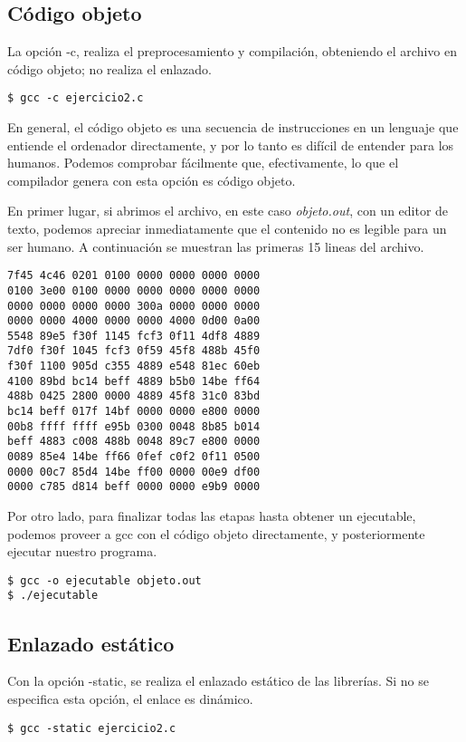 \documentclass[10pt,a4paper]{article}
\begin{document}
\subsection{Código objeto}
La opción -c, realiza el preprocesamiento y compilación, obteniendo el archivo en código objeto; no realiza el enlazado. 
\begin{lstlisting}[style=consola, numbers=none]
$ gcc -c ejercicio2.c
\end{lstlisting}
En general, el código objeto es una secuencia de instrucciones  en un lenguaje que entiende el ordenador directamente, y por lo tanto es difícil de entender para los humanos. Podemos comprobar fácilmente que, efectivamente, lo que el compilador genera con esta opción es código objeto.

En primer lugar, si abrimos el archivo, en este caso \textit{objeto.out}, con un editor de texto, podemos apreciar inmediatamente que el contenido no es legible para un ser humano. A continuación se muestran las primeras 15 lineas del archivo.

\begin{lstlisting}[style=consola, numbers=none]
7f45 4c46 0201 0100 0000 0000 0000 0000
0100 3e00 0100 0000 0000 0000 0000 0000
0000 0000 0000 0000 300a 0000 0000 0000
0000 0000 4000 0000 0000 4000 0d00 0a00
5548 89e5 f30f 1145 fcf3 0f11 4df8 4889
7df0 f30f 1045 fcf3 0f59 45f8 488b 45f0
f30f 1100 905d c355 4889 e548 81ec 60eb
4100 89bd bc14 beff 4889 b5b0 14be ff64
488b 0425 2800 0000 4889 45f8 31c0 83bd
bc14 beff 017f 14bf 0000 0000 e800 0000
00b8 ffff ffff e95b 0300 0048 8b85 b014
beff 4883 c008 488b 0048 89c7 e800 0000
0089 85e4 14be ff66 0fef c0f2 0f11 0500
0000 00c7 85d4 14be ff00 0000 00e9 df00
0000 c785 d814 beff 0000 0000 e9b9 0000
\end{lstlisting}

Por otro lado, para finalizar todas las etapas hasta obtener un ejecutable, podemos proveer a gcc con el código objeto directamente, y posteriormente ejecutar nuestro programa.
\begin{lstlisting}[style=consola, numbers=none]
$ gcc -o ejecutable objeto.out
$ ./ejecutable
\end{lstlisting}

\subsection{Enlazado estático}
Con la opción -static, se realiza el enlazado estático de las librerías. Si no se especifica esta opción, el enlace es dinámico.
\begin{lstlisting}[style=consola, numbers=none]
$ gcc -static ejercicio2.c
\end{lstlisting}
\end{document}
